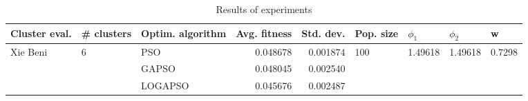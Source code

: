 \begin{table}
\centering
\caption{Results of experiments}
\begin{tabular}{lllrrllll}
\toprule
            Cluster eval. &        \# clusters & Optim. algorithm &  Avg. fitness &  Std. dev. &            Pop. size &               $\phi_{1}$ &               $\phi_{2}$ &                       w \\
\midrule
\multirow{3}{*}{Xie Beni} & \multirow{3}{*}{6} &              PSO &      0.048678 &   0.001874 & \multirow{3}{*}{100} & \multirow{3}{*}{1.49618} & \multirow{3}{*}{1.49618} & \multirow{3}{*}{0.7298} \\
                          &                    &            GAPSO &      0.048045 &   0.002540 &                      &                          &                          &                         \\
                          &                    &          LOGAPSO &      0.045676 &   0.002487 &                      &                          &                          &                         \\
\bottomrule
\end{tabular}
\end{table}
